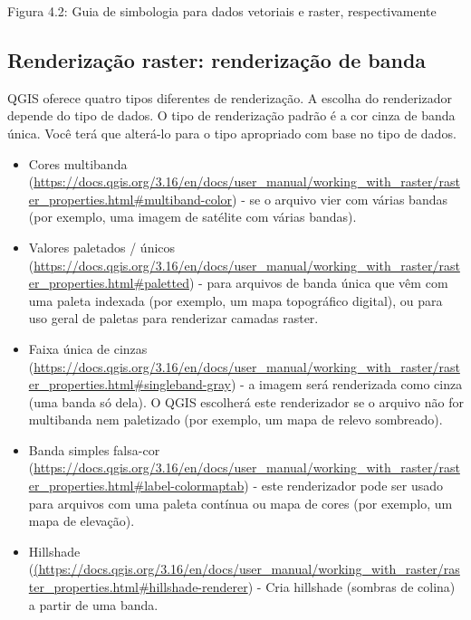 \documentclass[
  portuguese,
]{krantz}
\providecommand{\tightlist}{%
  \setlength{\itemsep}{0pt}\setlength{\parskip}{0pt}}
\begin{document}
Figura 4.2: Guia de simbologia para dados vetoriais e raster, respectivamente

\hypertarget{renderizauxe7uxe3o-raster-renderizauxe7uxe3o-de-banda}{%
\subsection{\texorpdfstring{\textbf{Renderização raster: renderização de banda}}{Renderização raster: renderização de banda}}\label{renderizauxe7uxe3o-raster-renderizauxe7uxe3o-de-banda}}

QGIS oferece quatro tipos diferentes de renderização. A escolha do renderizador depende do tipo de dados. O tipo de renderização padrão é a cor cinza de banda única. Você terá que alterá-lo para o tipo apropriado com base no tipo de dados.

\begin{itemize}
\tightlist
\item
  Cores multibanda (\url{https://docs.qgis.org/3.16/en/docs/user_manual/working_with_raster/raster_properties.html\#multiband-color}) - se o arquivo vier com várias bandas (por exemplo, uma imagem de satélite com várias bandas).
\item
  Valores paletados / únicos (\href{}{https://docs.qgis.org/3.16/en/docs/user\_manual/working\_with\_raster/raster\_properties.html\#paletted}) - para arquivos de banda única que vêm com uma paleta indexada (por exemplo, um mapa topográfico digital), ou para uso geral de paletas para renderizar camadas raster.
\item
  Faixa única de cinzas (\href{https://docs.qgis.org/3.16/en/docs/\%20user_manual\%20/\%20working_with_raster\%20/\%20raster_properties.html\%20\#\%20singleband-grey}{https://docs.qgis.org/3.16/en/docs/user\_manual/working\_with\_raster/raster\_properties.html\#singleband-gray}) - a imagem será renderizada como cinza (uma banda só dela). O QGIS escolherá este renderizador se o arquivo não for multibanda nem paletizado (por exemplo, um mapa de relevo sombreado).
\item
  Banda simples falsa-cor (\href{https://docs.qgis.org/3.16/en/docs/\%20user_manual\%20/\%20working_with_raster\%20/\%20raster_properties.html\%20\#\%20label-colormaptab}{https://docs.qgis.org/3.16/en/docs/user\_manual/working\_with\_raster/raster\_properties.html\#label-colormaptab}) - este renderizador pode ser usado para arquivos com uma paleta contínua ou mapa de cores (por exemplo, um mapa de elevação).
\item
  Hillshade (\href{https://docs.qgis.org/3.16/en/docs/\%20user_manual\%20/\%20working_with_raster\%20/\%20raster_properties.html\%20\#\%20hillshade-renderer}{(https://docs.qgis.org/3.16/en/docs/user\_manual/working\_with\_raster/raster\_properties.html\#hillshade-renderer}) - Cria hillshade (sombras de colina) a partir de uma banda.
\end{itemize}
\end{document}
